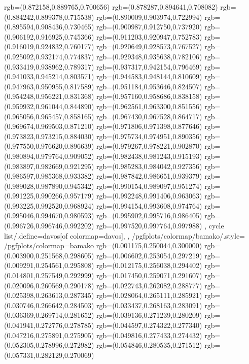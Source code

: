 {{{			rgb=(0.872158,0.889765,0.700656)
			rgb=(0.878287,0.894641,0.708082)
			rgb=(0.884242,0.899378,0.715538)
			rgb=(0.890009,0.903974,0.722994)
			rgb=(0.895594,0.908436,0.730465)
			rgb=(0.900987,0.912750,0.737920)
			rgb=(0.906192,0.916925,0.745366)
			rgb=(0.911203,0.920947,0.752783)
			rgb=(0.916019,0.924832,0.760177)
			rgb=(0.920649,0.928573,0.767527)
			rgb=(0.925092,0.932174,0.774837)
			rgb=(0.929348,0.935638,0.782106)
			rgb=(0.933419,0.938962,0.789317)
			rgb=(0.937317,0.942154,0.796469)
			rgb=(0.941033,0.945214,0.803571)
			rgb=(0.944583,0.948144,0.810609)
			rgb=(0.947963,0.950955,0.817589)
			rgb=(0.951184,0.953646,0.824507)
			rgb=(0.954248,0.956221,0.831368)
			rgb=(0.957160,0.958686,0.838158)
			rgb=(0.959932,0.961044,0.844890)
			rgb=(0.962561,0.963300,0.851556)
			rgb=(0.965056,0.965457,0.858165)
			rgb=(0.967430,0.967528,0.864717)
			rgb=(0.969674,0.969503,0.871210)
			rgb=(0.971806,0.971398,0.877646)
			rgb=(0.973823,0.973215,0.884030)
			rgb=(0.975734,0.974951,0.890356)
			rgb=(0.977550,0.976620,0.896639)
			rgb=(0.979267,0.978221,0.902870)
			rgb=(0.980894,0.979764,0.909052)
			rgb=(0.982438,0.981243,0.915193)
			rgb=(0.983897,0.982669,0.921295)
			rgb=(0.985283,0.984042,0.927356)
			rgb=(0.986597,0.985368,0.933382)
			rgb=(0.987842,0.986651,0.939379)
			rgb=(0.989028,0.987890,0.945342)
			rgb=(0.990154,0.989097,0.951274)
			rgb=(0.991225,0.990266,0.957179)
			rgb=(0.992248,0.991406,0.963063)
			rgb=(0.993225,0.992520,0.968924)
			rgb=(0.994154,0.993608,0.974764)
			rgb=(0.995046,0.994670,0.980593)
			rgb=(0.995902,0.995716,0.986405)
			rgb=(0.996726,0.996746,0.992202)
			rgb=(0.997520,0.997764,0.997988)
		},
	cycle list/.define={davos}{[of colormap=davos]},
	},
	/pgfplots/colormap/bamako/.style={
		/pgfplots/colormap={bamako}{%
			rgb=(0.001175,0.250044,0.300000)
			rgb=(0.003900,0.251568,0.298605)
			rgb=(0.006602,0.253054,0.297219)
			rgb=(0.009291,0.254561,0.295808)
			rgb=(0.012175,0.256038,0.294402)
			rgb=(0.014801,0.257549,0.292999)
			rgb=(0.017450,0.259071,0.291607)
			rgb=(0.020096,0.260569,0.290178)
			rgb=(0.022743,0.262082,0.288777)
			rgb=(0.025398,0.263613,0.287345)
			rgb=(0.028064,0.265111,0.285921)
			rgb=(0.030746,0.266642,0.284503)
			rgb=(0.033437,0.268163,0.283091)
			rgb=(0.036369,0.269714,0.281652)
			rgb=(0.039136,0.271239,0.280209)
			rgb=(0.041941,0.272776,0.278785)
			rgb=(0.044597,0.274322,0.277340)
			rgb=(0.047216,0.275891,0.275905)
			rgb=(0.049816,0.277433,0.274432)
			rgb=(0.052305,0.278996,0.272982)
			rgb=(0.054846,0.280535,0.271512)
			rgb=(0.057331,0.282129,0.270069)
}}}
